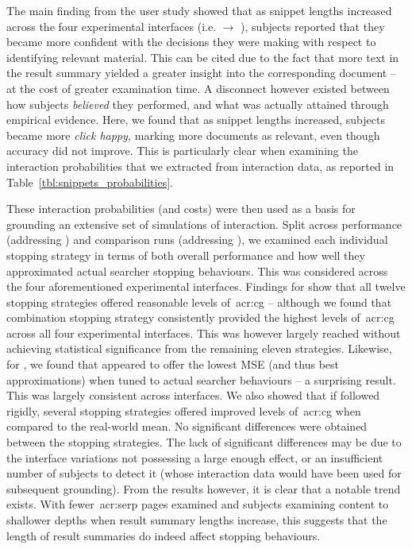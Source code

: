 The main finding from the user study showed that as snippet lengths increased across the four experimental interfaces (i.e.  $\rightarrow$ ), subjects reported that they became more confident with the decisions they were making with respect to identifying relevant material. This can be cited due to the fact that more text in the result summary yielded a greater insight into the corresponding document -- at the cost of greater examination time. A disconnect however existed between how subjects \emph{believed} they performed, and what was actually attained through empirical evidence. Here, we found that as snippet lengths increased, subjects became more \emph{click happy,} marking more documents as relevant, even though accuracy did not improve. This is particularly clear when examining the interaction probabilities that we extracted from interaction data, as reported in Table~\ref{tbl:snippets_probabilities}.

These interaction probabilities (and costs) were then used as a basis for grounding an extensive set of simulations of interaction. Split across performance (addressing ) and comparison runs (addressing ), we examined each individual stopping strategy in terms of both overall performance and how well they approximated actual searcher stopping behaviours. This was considered across the four aforementioned experimental interfaces. Findings for  show that all twelve stopping strategies offered reasonable levels of~\gls{acr:cg} -- although we found that combination stopping strategy  consistently provided the highest levels of~\gls{acr:cg} across all four experimental interfaces. This was however largely reached without achieving statistical significance from the remaining eleven strategies. Likewise, for , we found that  appeared to offer the lowest MSE (and thus best approximations) when tuned to actual searcher behaviours -- a surprising result. This was largely consistent across interfaces. We also showed that if followed rigidly, several stopping strategies offered improved levels of~\gls{acr:cg} when compared to the real-world mean. No significant differences were obtained between the stopping strategies. The lack of significant differences may be due to the interface variations not possessing a large enough effect, or an insufficient number of subjects to detect it (whose interaction data would have been used for subsequent grounding). From the results however, it is clear that a notable trend exists. With fewer~\gls{acr:serp} pages examined and subjects examining content to shallower depths when result summary lengths increase, this suggests that the length of result summaries do indeed affect stopping behaviours.

